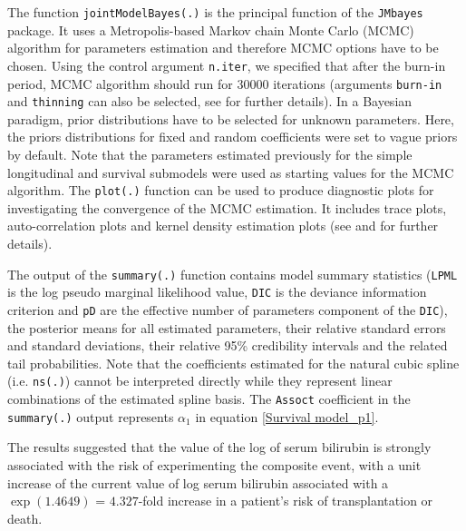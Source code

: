 \documentclass[12pt]{article}
\begin{document}
The function \texttt{jointModelBayes(.)} is the principal function of the \texttt{JMbayes} package. It uses a Metropolis-based Markov chain Monte Carlo (MCMC) algorithm for parameters estimation and therefore MCMC options have to be chosen. Using the control argument \texttt{n.iter}, we specified that after the burn-in period, MCMC algorithm should run for $30000$ iterations (arguments \texttt{burn-in} and \texttt{thinning} can also be selected, see \cite{JMbayes} for further details).
In a Bayesian paradigm, prior distributions have to be selected for unknown parameters. Here, the priors distributions for fixed and random coefficients were set to vague priors by default. Note that the parameters estimated previously for the simple longitudinal and survival submodels were used as starting values for the MCMC algorithm. The \texttt{plot(.)} function can be used to produce diagnostic plots for investigating the convergence of the MCMC estimation. It includes trace plots, auto-correlation plots and kernel density estimation plots (see \cite{JMbayes} and \cite{rizopoulos2017package} for further details).

The output of the \texttt{summary(.)} function contains model summary statistics (\texttt{LPML} is the log pseudo marginal likelihood value, \texttt{DIC} is the deviance information criterion and \texttt{pD} are the effective number of parameters component of the \texttt{DIC}), the posterior means for all estimated parameters, their relative standard errors and standard deviations, their relative 95\% credibility intervals and the related tail probabilities. Note that the coefficients estimated for the natural cubic spline (i.e. \texttt{ns(.)}) cannot be interpreted directly while they represent linear combinations of the estimated spline basis. The \texttt{Assoct} coefficient in the \texttt{summary(.)} output represents $\alpha_1$ in equation \eqref{Survival model_p1}.

The results suggested that the value of the log of serum bilirubin is strongly associated with the risk of experimenting the composite event, with a unit increase of the current value of log serum bilirubin associated with a $\exp(1.4649)$ = $4.327$-fold increase in a patient's risk of transplantation or death.
\end{document}
